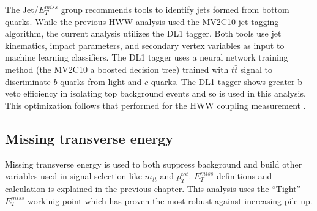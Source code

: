 The Jet/$E_T^{miss}$ group recommends tools to identify jets formed from bottom quarks. While the previous HWW analysis used the MV2C10 jet tagging algorithm, the current analysis utilizes the DL1 tagger. Both tools use jet kinematics, impact parameters, and secondary vertex variables as input to machine learning classifiers. The DL1 tagger uses a neural network training method (the MV2C10 a boosted decision tree) trained with $t\bar{t}$ signal to discriminate $b$-quarks from light and $c$-quarks. The DL1 tagger shows greater b-veto efficiency in isolating top background events and so is used in this analysis. This optimization follows that performed for the HWW coupling measurement \cite{HWWCoupling}. 

\subsection{Missing transverse energy}

Missing transverse energy is used to both suppress background and build other variables used in signal selection like $m_{tt}$ and $p_T^{tot}$. $E_T^{miss}$ definitions and calculation is explained in the previous chapter. This analysis uses the ``Tight'' $E_T^{miss}$ workinig point which has proven the most robust against increasing pile-up.

